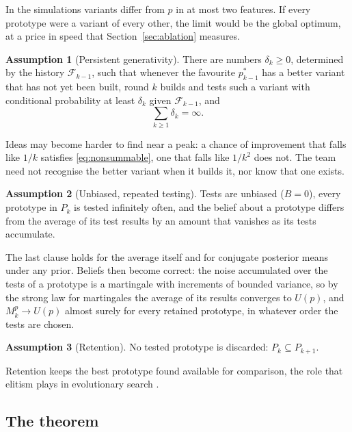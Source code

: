 \documentclass[preprint,review,11pt,authoryear]{elsarticle}
\newcommand{\filt}{\mathcal{F}}
\newcommand{\Pk}{P_k}
\theoremstyle{definition}
\newtheorem{assumption}{Assumption}
\begin{document}
In the simulations variants differ from $p$ in at most two features. If every prototype were a variant of every other, the limit would be the global optimum, at a price in speed that Section~\ref{sec:ablation} measures.

\begin{assumption}[Persistent generativity]
\label{as:gen}
There are numbers $\delta_k\ge0$, determined by the history $\filt_{k-1}$, such that whenever the favourite $p^*_{k-1}$ has a better variant that has not yet been built, round $k$ builds and tests such a variant with conditional probability at least $\delta_k$ given $\filt_{k-1}$, and
\begin{equation}
\label{eq:nonsummable}
\sum_{k\ge1}\delta_k=\infty .
\end{equation}
\end{assumption}

Ideas may become harder to find near a peak: a chance of improvement that falls like $1/k$ satisfies \eqref{eq:nonsummable}, one that falls like $1/k^2$ does not. The team need not recognise the better variant when it builds it, nor know that one exists.

\begin{assumption}[Unbiased, repeated testing]
\label{as:test}
Tests are unbiased ($B=0$), every prototype in $\Pk$ is tested infinitely often, and the belief about a prototype differs from the average of its test results by an amount that vanishes as its tests accumulate.
\end{assumption}

The last clause holds for the average itself and for conjugate posterior means under any prior. Beliefs then become correct: the noise accumulated over the tests of a prototype is a martingale with increments of bounded variance, so by the strong law for martingales \citep[Sec.~4.5]{durrett2019} the average of its results converges to $U(p)$, and $M^p_k\to U(p)$ almost surely for every retained prototype, in whatever order the tests are chosen.

\begin{assumption}[Retention]
\label{as:retention}
No tested prototype is discarded: $\Pk\subseteq P_{k+1}$.
\end{assumption}

Retention keeps the best prototype found available for comparison, the role that elitism plays in evolutionary search \citep{rudolph1994}.

\subsection{The theorem}
\end{document}
